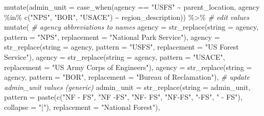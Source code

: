 \documentclass[
]{book}
\newenvironment{Shaded}{\begin{snugshade}}{\end{snugshade}}
\newcommand{\AttributeTok}[1]{\textcolor[rgb]{0.77,0.63,0.00}{#1}}
\newcommand{\CommentTok}[1]{\textcolor[rgb]{0.56,0.35,0.01}{\textit{#1}}}
\newcommand{\FunctionTok}[1]{\textcolor[rgb]{0.00,0.00,0.00}{#1}}
\newcommand{\NormalTok}[1]{#1}
\newcommand{\SpecialCharTok}[1]{\textcolor[rgb]{0.00,0.00,0.00}{#1}}
\newcommand{\StringTok}[1]{\textcolor[rgb]{0.31,0.60,0.02}{#1}}
\begin{document}
\begin{Shaded}
\begin{Highlighting}[]
\FunctionTok{mutate}\NormalTok{(}\AttributeTok{admin\_unit =} \FunctionTok{case\_when}\NormalTok{(agency }\SpecialCharTok{==} \StringTok{"USFS"} \SpecialCharTok{\textasciitilde{}}\NormalTok{ parent\_location,}
\NormalTok{                              agency }\SpecialCharTok{\%in\%} \FunctionTok{c}\NormalTok{(}\StringTok{"NPS"}\NormalTok{, }\StringTok{"BOR"}\NormalTok{, }\StringTok{"USACE"}\NormalTok{) }\SpecialCharTok{\textasciitilde{}}\NormalTok{ region\_description)) }\SpecialCharTok{\%\textgreater{}\%} 
  \CommentTok{\# edit values}
  \FunctionTok{mutate}\NormalTok{(}
    \CommentTok{\# agency abbreviations to names}
    \AttributeTok{agency =} \FunctionTok{str\_replace}\NormalTok{(}\AttributeTok{string =}\NormalTok{ agency,}
                         \AttributeTok{pattern =} \StringTok{"NPS"}\NormalTok{,}
                         \AttributeTok{replacement =} \StringTok{"National Park Service"}\NormalTok{),}
    \AttributeTok{agency =} \FunctionTok{str\_replace}\NormalTok{(}\AttributeTok{string =}\NormalTok{ agency,}
                         \AttributeTok{pattern =} \StringTok{"USFS"}\NormalTok{, }
                         \AttributeTok{replacement =} \StringTok{"US Forest Service"}\NormalTok{),}
    \AttributeTok{agency =} \FunctionTok{str\_replace}\NormalTok{(}\AttributeTok{string =}\NormalTok{ agency,}
                         \AttributeTok{pattern =} \StringTok{"USACE"}\NormalTok{,}
                         \AttributeTok{replacement =} \StringTok{"US Army Corps of Engineers"}\NormalTok{),}
    \AttributeTok{agency =} \FunctionTok{str\_replace}\NormalTok{(}\AttributeTok{string =}\NormalTok{ agency,}
                         \AttributeTok{pattern =} \StringTok{"BOR"}\NormalTok{,}
                         \AttributeTok{replacement =} \StringTok{"Bureau of Reclamation"}\NormalTok{),}
    \CommentTok{\# update admin\_unit values (generic)}
    \AttributeTok{admin\_unit =} \FunctionTok{str\_replace}\NormalTok{(}\AttributeTok{string =}\NormalTok{ admin\_unit,}
                             \AttributeTok{pattern =} \FunctionTok{paste}\NormalTok{(}\FunctionTok{c}\NormalTok{(}\StringTok{"NF {-} FS"}\NormalTok{, }\StringTok{"NF {-}FS"}\NormalTok{, }\StringTok{"NF{-} FS"}\NormalTok{, }
                                               \StringTok{"NF{-}FS"}\NormalTok{, }\StringTok{"{-}FS"}\NormalTok{, }\StringTok{" {-} FS"}\NormalTok{), }
                                             \AttributeTok{collapse =} \StringTok{"|"}\NormalTok{),}
                             \AttributeTok{replacement =} \StringTok{"National Forest"}\NormalTok{),}

\end{Highlighting}
\end{Shaded}
\end{document}

